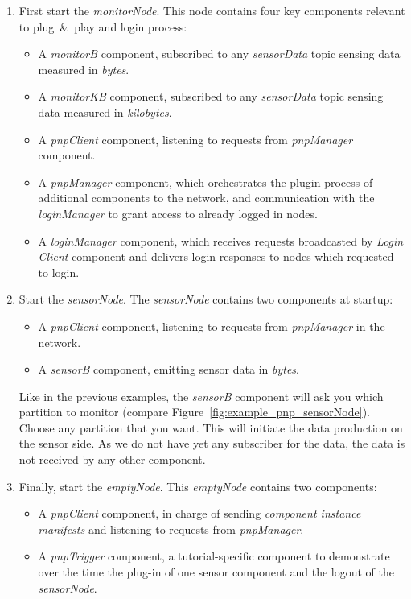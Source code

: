 \begin{enumerate}
	\item First start the \emph{monitorNode}. This node contains four key components relevant to plug~\&~play and login process:
		\begin{itemize}
			\item A \emph{monitorB} component, subscribed to any \emph{sensorData} topic sensing data measured in \emph{bytes}.
			\item A \emph{monitorKB} component, subscribed to any \emph{sensorData} topic sensing data measured in \emph{kilobytes}.
			\item A \emph{pnpClient} component, listening to requests from \emph{pnpManager} component.
			\item A \emph{pnpManager} component, which orchestrates the plugin process of additional components to the network, and communication with the \emph{loginManager}
			  to grant access to already logged in nodes.
			\item A \emph{loginManager} component, which receives requests broadcasted by \emph{Login Client} component and delivers login responses to nodes which requested to login.
		\end{itemize}
	\item Start the \emph{sensorNode}. The \emph{sensorNode} contains two components at startup:
		\begin{itemize}
			\item A \emph{pnpClient} component, listening to requests from \emph{pnpManager} in the network.
			\item A \emph{sensorB} component, emitting sensor data in \emph{bytes}.
		\end{itemize}
		Like in the previous examples, the \emph{sensorB} component will ask you which partition to monitor
		(compare Figure~\ref{fig:example_pnp_sensorNode}).
		Choose any partition that you want. This will initiate the data production on the sensor side.
		As we do not have yet any subscriber for the data, the data is not received by any other component.
	\item Finally, start the \emph{emptyNode}. This \emph{emptyNode} contains two components:
		\begin{itemize}
			\item A \emph{pnpClient} component, in charge of sending \emph{component instance manifests} and listening to requests from \emph{pnpManager}.
			\item A \emph{pnpTrigger} component, a tutorial-specific component to demonstrate over the time the plug-in of one sensor component and the logout of the \emph{sensorNode}.
		\end{itemize}
\end{enumerate}	
		
